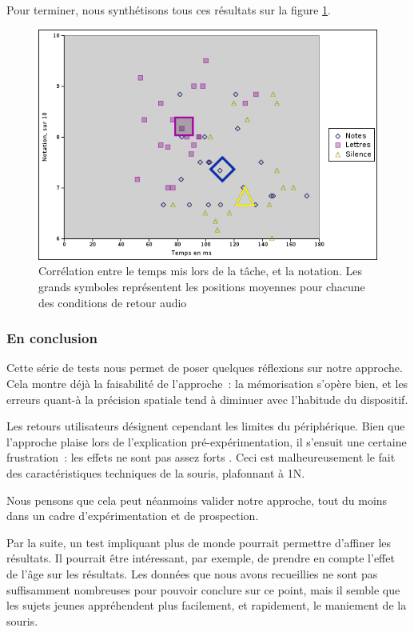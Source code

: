 \documentclass[
]{book}
\begin{document}
Pour terminer, nous synthétisons tous ces résultats sur la
figure \ref{fig:correlation}.

\begin{figure}
\centering
\includegraphics{img/res_correlation.png}
\caption{\label{fig:correlation}Corrélation entre le temps mis lors
de la tâche, et la notation. Les grands symboles représentent les
positions moyennes pour chacune des conditions de retour
audio}
\end{figure}

\hypertarget{en-conclusion}{%
\subsubsection{En conclusion}\label{en-conclusion}}

Cette série de tests nous permet de poser quelques réflexions sur notre
approche. Cela montre déjà la faisabilité de l'approche~: la mémorisation
s'opère bien, et les erreurs quant-à la précision spatiale tend à diminuer
avec l'habitude du dispositif.

Les retours utilisateurs désignent cependant les limites du périphérique.
Bien que l'approche plaise lors de l'explication pré-expérimentation, il
s'ensuit une certaine frustration~: les effets ne sont pas assez forts . Ceci
est malheureusement le fait des caractéristiques techniques de la souris,
plafonnant à 1N.

Nous pensons que cela peut néanmoins valider notre approche, tout du moins
dans un cadre d'expérimentation et de prospection.

Par la suite, un test impliquant plus de monde pourrait permettre
d'affiner les résultats. Il pourrait être intéressant, par exemple, de
prendre en compte l'effet de l'âge sur les résultats. Les données que nous
avons recueillies ne sont pas suffisamment nombreuses pour pouvoir conclure
sur ce point, mais il semble que les sujets jeunes appréhendent plus
facilement, et rapidement, le maniement de la souris.
\end{document}
